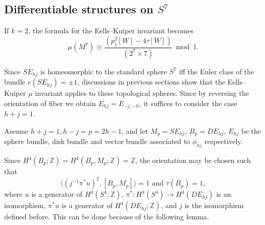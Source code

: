 \documentclass[twoside]{article}
\begin{document}
\subsection{Differentiable structures on \texorpdfstring{$S^7$}{S7}}


If $k = 2$, the formula for the Eells--Kuiper invariant becomes
\[
    \mu(M^{7})  \equiv \frac{(p_{1}^{2}[W]-4 \tau[W]) }{ (2^{7} \times 7)}  \bmod 1. 
\]

Since $SE_{hj}$ is homeomorphic to the standard sphere $S^7$ iff the Euler class of the bundle  $e(SE_{hj}) = \pm 1$, discussions in previous sections show that the Eells--Kuiper $\mu$ invariant applies to these topological spheres. Since by reversing the orientation of fiber we obtain  $\overline{E_{hj}} = E_{-j,-h}$, it suffices to consider the case $h + j = 1$. 

Assume $h + j = 1, h-j = p = 2h-1$, and let $M_p = SE_{hj}$,  $B_p = DE_{hj}$, $E_{hj}$ be the sphere bundle, disk bundle and vector bundle associated to $\phi_{hj}$ respectively. 

Since $H^4(B_p;\mathbb{Z}) = H^4(B_p,M_p;\mathbb{Z}) = \mathbb{Z}$, the orientation may be chosen such that
\[
    \langle(j^{-1}\pi^*u)^2,[B_p,M_p]\rangle = 1\text{ and }\tau(B_p) = 1, 
\]
where $u$ is a generator of $H^4(S^4;\mathbb{Z})$, $\pi^* \colon H^4(S^4) \to  H^4(DE_{hj})$ is an isomorphism,  $\pi^*u$ is a generator of $H^4(DE_{hj};\mathbb{Z})$, and $j$ is the isomorphism defined before. This can be done because of the following lemma. 
\end{document}
